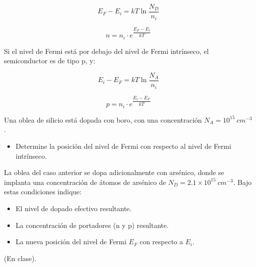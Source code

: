 \[ E_F - E_i =  kT \ln \dfrac{N_D}{n_i} \]

\[ n = n_i \cdot e^{\dfrac{E_F-E_i}{kT}} \]

Si el nivel de Fermi está por debajo del nivel de Fermi intrínseco, el semiconductor es de tipo p, y:

\[ E_i - E_F =  kT \ln \dfrac{N_A}{n_i} \]

\[ p = n_i \cdot e^{\dfrac{E_i-E_F}{kT}} \]

\begin{ejemplo}
Una oblea de silicio está dopada con boro, con una concentración $N_A=10^{15}\ cm^{-3}$. 

\begin{itemize}
    \item Determine la posición del nivel de Fermi con respecto al nivel de Fermi intrínseco.
\end{itemize}

La oblea del caso anterior se dopa adicionalmente con arsénico, donde se implanta una concentración de átomos de arsénico de $N_D=2.1 \times 10^{15}\ cm^{-3}$. Bajo estas condiciones indique:

\begin{itemize}
    \item El nivel de dopado efectivo resultante.
    \item La concentración de portadores (n y p) resultante.
    \item La nueva posición del nivel de Fermi $E_F$ con respecto a $E_i$.
\end{itemize}

\end{ejemplo}

\begin{solucion}
(En clase).
\end{solucion}




